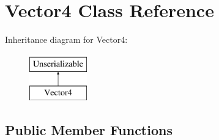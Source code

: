\hypertarget{class_vector4}{\section{\-Vector4 \-Class \-Reference}
\label{class_vector4}
}
\-Inheritance diagram for \-Vector4\-:\begin{figure}[H]
\begin{center}
\leavevmode
\includegraphics[height=2.000000cm]{class_vector4}
\end{center}
\end{figure}
\subsection*{\-Public \-Member \-Functions}
